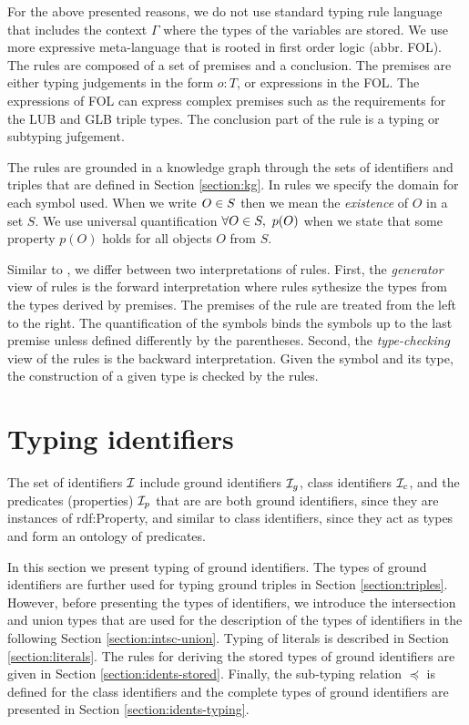 \documentclass[runningheads]{llncs}
\newcommand{\I}{{\cal I}}
\begin{document}
For the above presented reasons, we do not use standard typing rule
language \cite{Pierce2002,Hindley1997} that includes the context
$\Gamma$ where the types of the variables are stored. We use more
expressive meta-language that is rooted in first order logic
(abbr. FOL). The rules are composed of a set of premises and a
conclusion. The premises are either typing judgements in the form
$o:T$, or expressions in the FOL. The expressions of FOL can express
complex premises such as the requirements for the LUB and GLB triple
types. The conclusion part of the rule is a typing or subtyping
jufgement.

The rules are grounded in a knowledge graph through the sets of
identifiers and triples that are defined in Section
\ref{section:kg}. In rules we specify the domain for each symbol used.
When we write $O\in\/S$ then we mean the \emph{existence} of $O$ in a
set $S$. We use universal quantification $\forall\/O\in\/S,\ p(O)$
when we state that some property $p(O)$ holds for all objects $O$ from
$S$.

Similar to \cite{Dunfield2021}, we differ between two interpretations
of rules. First, the \emph{generator} view of rules is the forward
interpretation where rules sythesize the types from the types derived
by premises. The premises of the rule are treated from the left to the
right. The quantification of the symbols binds the symbols up to the
last premise unless defined differently by the parentheses. Second,
the \emph{type-checking} view of the rules is the backward
interpretation. Given the symbol and its type, the construction of a
given type is checked by the rules.




\section{Typing identifiers}

The set of identifiers $\I$ include ground identifiers $\I_g$, class
identifiers $\I_c$, and the predicates (properties) $\I_p$ that are
are both ground identifiers, since they are instances of rdf:Property,
and similar to class identifiers, since they act as types and form an
ontology of predicates.

In this section we present typing of ground identifiers. The types of
ground identifiers are further used for typing ground triples in
Section \ref{section:triples}. However, before presenting the types of
identifiers, we introduce the intersection and union types that are
used for the description of the types of identifiers in the following
Section \ref{section:intsc-union}. Typing of literals is described in
Section \ref{section:literals}. The rules for deriving the stored
types of ground identifiers are given in Section
\ref{section:idents-stored}. Finally, the sub-typing relation $\preceq$ is
defined for the class identifiers and the complete types of ground
identifiers are presented in Section \ref{section:idents-typing}.
\end{document}
